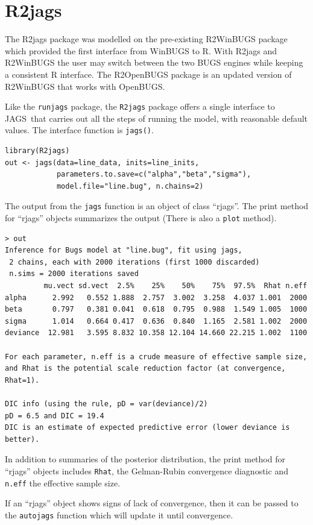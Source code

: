 \documentclass[11pt, a4paper, titlepage]{report}
\newcommand{\JAGS}{\textsf{JAGS}}
\begin{document}
\section{R2jags}

The R2jags package \citep{SuYajima2015} was modelled on the
pre-existing R2WinBUGS package \citep{SturtzEtal2005} which provided
the first interface from WinBUGS to R. With R2jags and R2WinBUGS the
user may switch between the two BUGS engines while keeping a
consistent R interface. The R2OpenBUGS package is an updated version
of R2WinBUGS that works with OpenBUGS.

Like the \texttt{runjags} package, the \texttt{R2jags} package offers
a single interface to \JAGS\ that carries out all the steps of running
the model, with reasonable default values. The interface function is
\texttt{jags()}.
\begin{verbatim}
library(R2jags)
out <- jags(data=line_data, inits=line_inits,
            parameters.to.save=c("alpha","beta","sigma"),
            model.file="line.bug", n.chains=2)
\end{verbatim}
The output from the \texttt{jags} function is an object of class ``rjags''.
The print method for ``rjags'' objects summarizes the output (There is
also a \texttt{plot} method).
\begin{verbatim}
> out
Inference for Bugs model at "line.bug", fit using jags,
 2 chains, each with 2000 iterations (first 1000 discarded)
 n.sims = 2000 iterations saved
         mu.vect sd.vect  2.5%    25%    50%    75%  97.5%  Rhat n.eff
alpha      2.992   0.552 1.888  2.757  3.002  3.258  4.037 1.001  2000
beta       0.797   0.381 0.041  0.618  0.795  0.988  1.549 1.005  1000
sigma      1.014   0.664 0.417  0.636  0.840  1.165  2.581 1.002  2000
deviance  12.981   3.595 8.832 10.358 12.104 14.660 22.215 1.002  1100

For each parameter, n.eff is a crude measure of effective sample size,
and Rhat is the potential scale reduction factor (at convergence, Rhat=1).

DIC info (using the rule, pD = var(deviance)/2)
pD = 6.5 and DIC = 19.4
DIC is an estimate of expected predictive error (lower deviance is better).
\end{verbatim}
In addition to summaries of the posterior distribution, the print method
for ``rjags'' objects includes \texttt{Rhat}, the Gelman-Rubin convergence
diagnostic \citep{GelmanRubin1992} and \texttt{n.eff} the effective
sample size.

If an ``rjags'' object shows signs of lack of convergence, then it
can be passed to the \texttt{autojags} function which will update it
until convergence.
\end{document}

